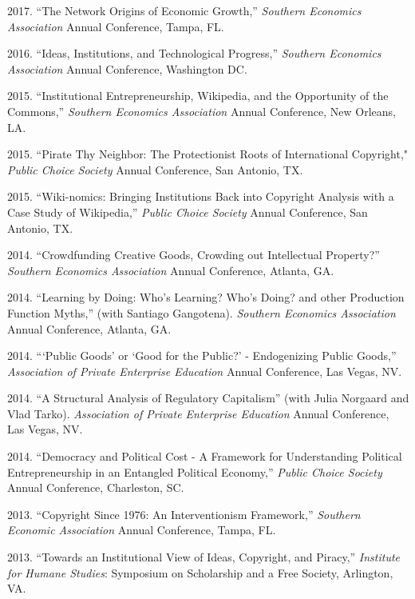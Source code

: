 \documentclass[]{article}
\renewenvironment{itemize}{
  \begin{list}{}{
    \setlength{\leftmargin}{1.5em}
  }
}{
  \end{list}
}
\begin{document}
\begin{itemize}
    \item 2017. ``The Network Origins of Economic Growth,'' \emph{Southern Economics Association} Annual Conference, Tampa, FL.  
    \item 2016. ``Ideas, Institutions, and Technological Progress,'' \emph{Southern Economics Association} Annual Conference, Washington DC. 
    \item 2015. ``Institutional Entrepreneurship, Wikipedia, and the Opportunity of the Commons,'' \emph{Southern Economics Association} Annual Conference, New Orleans, LA. 
    \item 2015. ``Pirate Thy Neighbor: The Protectionist Roots of International Copyright," \emph{Public Choice Society} Annual Conference, San Antonio, TX.
    \item 2015. ``Wiki-nomics: Bringing Institutions Back into Copyright Analysis with a Case Study of Wikipedia,'' \emph{Public Choice Society} Annual Conference, San Antonio, TX. 
    \item 2014. ``Crowdfunding Creative Goods, Crowding out Intellectual Property?'' \emph{Southern Economics Association} Annual Conference, Atlanta, GA.
    \item 2014. ``Learning by Doing: Who's Learning? Who's Doing? and other Production Function Myths,'' (with Santiago Gangotena). \emph{Southern Economics Association} Annual Conference, Atlanta, GA.
    \item 2014. ```Public Goods' or  `Good for the Public?' - Endogenizing Public Goods,''  \emph{Association of Private Enterprise Education} Annual Conference, Las Vegas, NV.
    \item 2014. ``A Structural Analysis of Regulatory Capitalism'' (with Julia Norgaard and Vlad Tarko).  \emph{Association of Private Enterprise Education} Annual Conference, Las Vegas, NV.
    \item 2014. ``Democracy and Political Cost - A Framework for Understanding Political Entrepreneurship in an Entangled Political Economy,'' \emph{Public Choice Society} Annual Conference, Charleston, SC.
    \item 2013. ``Copyright Since 1976: An Interventionism Framework,''  \emph{Southern Economic Association} Annual Conference, Tampa, FL.
    \item 2013. ``Towards an Institutional View of Ideas, Copyright, and Piracy,'' \emph{Institute for Humane Studies}: Symposium on Scholarship and a Free Society, Arlington, VA.
\end{itemize}
\end{document}
